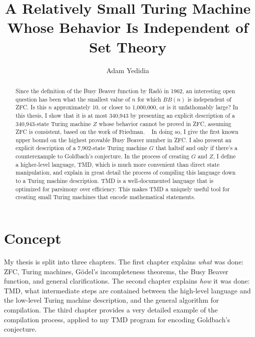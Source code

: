 \documentclass[11pt]{report}
\newcommand{\statenumstate}{340,943-state }
\newcommand{\statenum}{340,943 }
\newcommand{\gbstatenumstate}{7,902-state }
\begin{document}
\title{A Relatively Small Turing Machine Whose Behavior Is Independent of Set Theory}
\author{Adam Yedidia}

\maketitle

\begin{abstract}

Since the definition of the Busy Beaver function by Rad\'{o} in 1962, an interesting open question has been what the smallest value of $n$ for which $BB(n)$ is independent of ZFC. Is this $n$ approximately 10, or closer to 1,000,000, or is it unfathomably large? In this thesis, I show that it is at most \statenum by presenting an explicit description of a \statenumstate Turing machine $Z$ whose behavior cannot be proved in ZFC, assuming ZFC is consistent, based on the work of Friedman. \cite{friedman}~
In doing so, I give the first known upper bound on the highest provable Busy Beaver number in ZFC. I also present an explicit description of a \gbstatenumstate Turing machine $G$ that haltsif and only if there's a counterexample to Goldbach's conjecture. In the process of creating $G$ and $Z$, I define a higher-level language, TMD, which is much more convenient than direct state manipulation, and explain in great detail the process of compiling this language down to a Turing machine description. TMD is a well-documented language that is optimized for parsimony over efficiency. This makes TMD a uniquely useful tool for creating small Turing machines that encode mathematical statements. 

\end{abstract}

\chapter{Concept}

My thesis is split into three chapters. The first chapter explains \emph{what} was done: ZFC, Turing machines, G\"{o}del's incompleteness theorems, the Busy Beaver function, and general clarifications. The second chapter explains \emph{how} it was done: TMD, what intermediate steps are contained between the high-level language and the low-level Turing machine description, and the general algorithm for compilation. The third chapter provides a very detailed example of the compilation process, applied to my TMD program for encoding Goldbach's conjecture.
\end{document}
